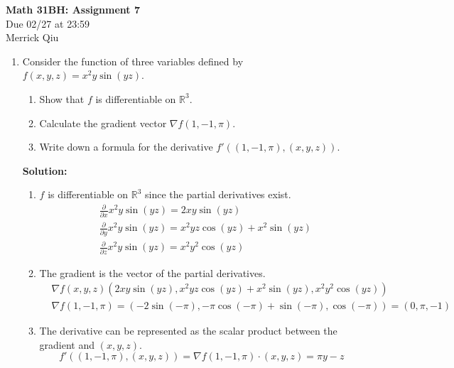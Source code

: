 \documentclass{report}
\newcommand{\solution}{\textbf{Solution: }}
\newcommand{\pdiv}[1]{\frac{\partial}{\partial #1}}
\begin{document}
\begin{center}
	\huge{\bf Math 31BH: Assignment 7} \\
	Due 02/27 at 23:59 \\
	Merrick Qiu
\end{center}

\bigskip

\begin{enumerate}

	\medskip
	\item
	Consider the function of three variables defined by $f(x,y,z) = x^2y\sin(yz)$.
	
		\begin{enumerate}
		
		\smallskip
		\item
		Show that $f$ is differentiable on $\mathbb{R}^3$.
		
		\smallskip
		\item
		Calculate the gradient vector $\nabla f(1,-1,\pi)$.
		
		\smallskip
		\item
		Write down a formula for the derivative 
		$f'((1,-1,\pi),(x,y,z))$.
		
		\end{enumerate}
		
	\solution 
	\begin{enumerate}
		\item 
		$f$ is differentiable on $\mathbb{R}^3$
		since the partial derivatives exist.
		\begin{align*}
			&\pdiv{x} x^2y\sin(yz) = 2xy\sin(yz) \\
			&\pdiv{y} x^2y\sin(yz) = x^2yz\cos(yz) + x^2\sin(yz) \\
			&\pdiv{z} x^2y\sin(yz) = x^2y^2\cos(yz) 
		\end{align*}

		\item 
		The gradient is the vector of the partial derivatives.
		\begin{align*}
			&\nabla f(x,y,z) 
			(2xy\sin(yz), x^2yz\cos(yz) + x^2\sin(yz), x^2y^2\cos(yz)) \\
			&\nabla f(1,-1, \pi) = 
			(-2\sin(-\pi), -\pi\cos(-\pi) + \sin(-\pi), \cos(-\pi)) =
			(0, \pi, -1)
		\end{align*}
			
		\item 
		The derivative can be represented as the scalar product between 
		the gradient and $(x,y,z)$. 
		\[
			f'((1, -1, \pi),(x, y, z)) =
			\nabla f(1, -1, \pi) \cdot (x, y, z) =
			\pi y-z
		\]
	\end{enumerate}


\end{enumerate}
\end{document}
